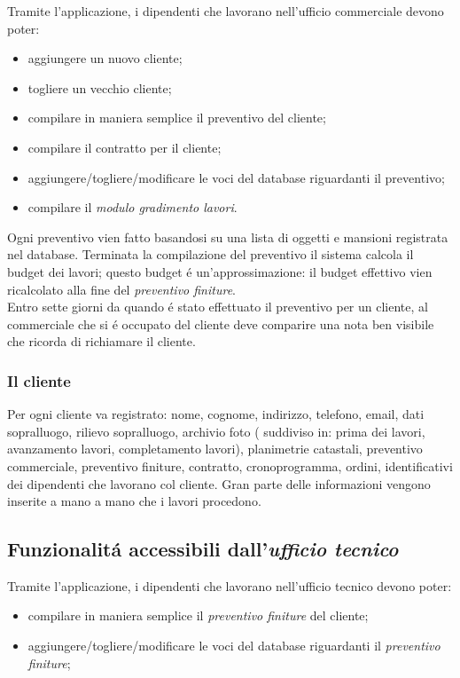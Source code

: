 \documentclass[paper=a4, fontsize=11pt]{scrartcl} %
\numberwithin{equation}{section} %
\numberwithin{figure}{section} %
\numberwithin{table}{section} %
\begin{document}
Tramite l'applicazione, i dipendenti che lavorano nell'ufficio commerciale
devono poter:
\begin{itemize}
\item aggiungere un nuovo cliente;
\item togliere un vecchio cliente;
\item compilare in maniera semplice il preventivo del cliente;
\item compilare il contratto per il cliente;
\item aggiungere/togliere/modificare le voci del database riguardanti il preventivo;
\item compilare il \textit{modulo gradimento lavori}.
\end{itemize}

Ogni preventivo vien fatto basandosi su una lista di oggetti e mansioni
registrata nel database.
Terminata la compilazione del preventivo il sistema calcola il budget
dei lavori; questo budget \'e un'approssimazione: il budget effettivo
vien ricalcolato alla fine del \textit{preventivo finiture}.\\

Entro sette giorni da quando \'e stato effettuato il preventivo per un cliente,
al commerciale che si \'e occupato del cliente deve comparire una nota ben
visibile che ricorda di richiamare il cliente.

\subsubsection{Il cliente}

Per ogni cliente va registrato: nome, cognome, indirizzo, telefono, email, dati sopralluogo,
rilievo sopralluogo, archivio foto ( suddiviso in: prima dei lavori, avanzamento lavori,
completamento lavori), planimetrie catastali, preventivo commerciale, preventivo
finiture, contratto, cronoprogramma, ordini, identificativi dei dipendenti che lavorano
col cliente.
Gran parte delle informazioni vengono inserite a mano a mano che i lavori procedono.


\subsection{Funzionalit\'a accessibili dall'\textit{ufficio tecnico}}

Tramite l'applicazione, i dipendenti che lavorano nell'ufficio tecnico
devono poter:
\begin{itemize}
\item compilare in maniera semplice il \textit{preventivo finiture} del cliente;
\item aggiungere/togliere/modificare le voci del database riguardanti il \textit{preventivo finiture};
\end{itemize}
\end{document}
